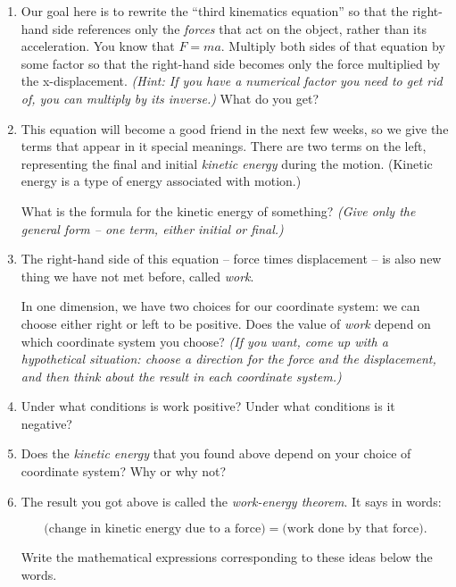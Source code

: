 \documentclass[12pt]{article}
\begin{document}
\begin{enumerate}
	\item Our goal here is to rewrite the ``third kinematics equation'' so that the right-hand side references only the {\it forces} that act on the object, rather than its acceleration. You know that $F=ma$. Multiply both sides of that equation by some factor so that the right-hand side becomes only the force multiplied by the x-displacement.  {\it (Hint: If you have a numerical factor you need to get rid of, you can multiply by its inverse.)} What do you get? 
	
	
	\vspace{1in}
	
	\item This equation will become a good friend in the next few weeks, so we give the terms that appear in it special meanings. There are two terms on the left, representing the final and initial {\it kinetic energy} during the motion. (Kinetic energy is a type of energy associated with motion.)
	
	What is the formula for the kinetic energy of something? {\it (Give only the general form -- one term, either initial or final.)}
	
	\vspace{1in}
	
	\item The right-hand side of this equation -- force times displacement -- is also new thing we have not met before, called {\it work}. 
	
	In one dimension, we have two choices for our coordinate system: we can choose either right or left to be positive. Does the value of {\it work} depend on which coordinate system you choose? {\it (If you want, come up with a hypothetical situation: choose a direction for the force and the displacement, and then think about the result in each coordinate system.)}
	
	\vspace{1in}
	\newpage
	\item Under what conditions is work positive? Under what conditions is it negative?
	\vspace{2in}
	
	\item Does the {\it kinetic energy} that you found above depend on your choice of coordinate system? Why or why not?
	
	\vspace{2in}
	
	\item The result you got above is called the {\it work-energy theorem}. It says in words:
	
	$$\text{(change in kinetic energy due to a force)} = \text{(work done by that force)}.$$
	
	\vspace{1in}
	
	Write the mathematical expressions corresponding to these ideas below the words.
\end{enumerate}
\end{document}
